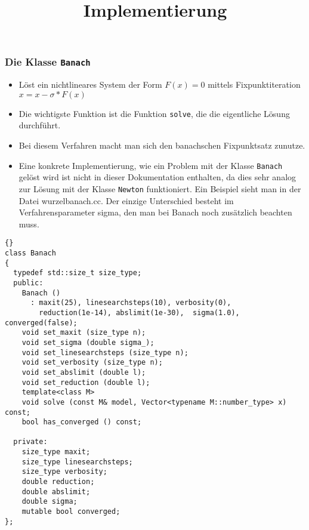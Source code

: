 \documentclass[a4paper,11pt]{article}
\theoremstyle{definition}
\begin{document}
  
\subsubsection{Die Klasse \lstinline{Banach}}
\begin{itemize}
\item Löst ein nichtlineares System der Form $F(x)=0$ mittels Fixpunktiteration $x = x - \sigma*F(x)$
\item Die wichtigste Funktion ist die Funktion \lstinline{solve}, die die eigentliche Lösung durchführt.
\item Bei diesem Verfahren macht man sich den banachschen Fixpunktsatz zunutze.
\item Eine konkrete Implementierung, wie ein Problem mit der Klasse \lstinline{Banach} gelöst wird ist nicht in dieser Dokumentation enthalten, da dies sehr analog zur Lösung mit der Klasse \lstinline{Newton} funktioniert. Ein Beispiel sieht man in der Datei wurzelbanach.cc. Der einzige Unterschied besteht im Verfahrensparameter sigma, den man bei Banach noch zusätzlich beachten muss.
\end{itemize}




\title{\textbf{Implementierung}}
{\footnotesize{\begin{lstlisting}{}
class Banach
{
  typedef std::size_t size_type;  
  public:
    Banach ()
      : maxit(25), linesearchsteps(10), verbosity(0), 
        reduction(1e-14), abslimit(1e-30),  sigma(1.0), converged(false);
    void set_maxit (size_type n);
    void set_sigma (double sigma_);
    void set_linesearchsteps (size_type n);
    void set_verbosity (size_type n);
    void set_abslimit (double l);
    void set_reduction (double l);
    template<class M>
    void solve (const M& model, Vector<typename M::number_type> x) const;
    bool has_converged () const;

  private:
    size_type maxit;
    size_type linesearchsteps;
    size_type verbosity;
    double reduction;
    double abslimit;
    double sigma;
    mutable bool converged;
};
\end{lstlisting}}} 
\end{document}
